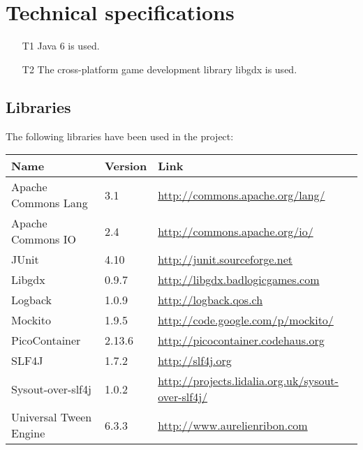 \documentclass[fontsize=12pt,
               paper=a4,
               twoside=false,
               parskip=half,
               ]{scrartcl}
\begin{document}
\section{Technical specifications}
\begin{itemize}
	\item[T1] Java 6 is used.
	\item[T2] The cross-platform game development library libgdx is used. 
\end{itemize}

\subsection{Libraries}
The following libraries have been used in the project:

\begin{tabular}{| l | l | l |}
	\hline
	\textbf{Name} & \textbf{Version} & \textbf{Link} \\ \hline
	Apache Commons Lang & 3.1 & \url{http://commons.apache.org/lang/} \\ \hline
	Apache Commons IO & 2.4 & \url{http://commons.apache.org/io/} \\ \hline
	JUnit & 4.10 & \url{http://junit.sourceforge.net} \\ \hline
	Libgdx & 0.9.7 & \url{http://libgdx.badlogicgames.com} \\ \hline
	Logback & 1.0.9 & \url{http://logback.qos.ch} \\ \hline
	Mockito & 1.9.5 & \url{http://code.google.com/p/mockito/} \\ \hline
	PicoContainer & 2.13.6 & \url{http://picocontainer.codehaus.org} \\ \hline
	SLF4J & 1.7.2 & \url{http://slf4j.org} \\ \hline
	Sysout-over-slf4j & 1.0.2 & \url{http://projects.lidalia.org.uk/sysout-over-slf4j/} \\ \hline
	Universal Tween Engine & 6.3.3 & \url{http://www.aurelienribon.com} \\ \hline
\end{tabular}
\end{document}
